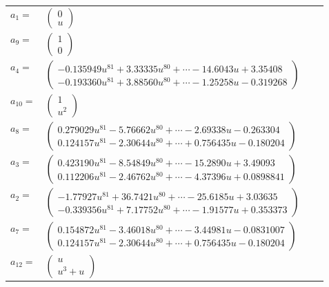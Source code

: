 \documentclass[1p]{elsarticle_modified}
\theoremstyle{definition}
\begin{document}
\begin{tabular}{m{7pt} m{180pt} m{7pt} m{180pt} }
\flushright $a_{1}=$&$\begin{pmatrix}0\\u\end{pmatrix}$ \\
\flushright $a_{9}=$&$\begin{pmatrix}1\\0\end{pmatrix}$ \\
\flushright $a_{4}=$&$\begin{pmatrix}-0.135949 u^{81}+3.33335 u^{80}+\cdots-14.6043 u+3.35408\\-0.193360 u^{81}+3.88560 u^{80}+\cdots-1.25258 u-0.319268\end{pmatrix}$ \\
\flushright $a_{10}=$&$\begin{pmatrix}1\\u^2\end{pmatrix}$ \\
\flushright $a_{8}=$&$\begin{pmatrix}0.279029 u^{81}-5.76662 u^{80}+\cdots-2.69338 u-0.263304\\0.124157 u^{81}-2.30644 u^{80}+\cdots+0.756435 u-0.180204\end{pmatrix}$ \\
\flushright $a_{3}=$&$\begin{pmatrix}0.423190 u^{81}-8.54849 u^{80}+\cdots-15.2890 u+3.49093\\0.112206 u^{81}-2.46762 u^{80}+\cdots-4.37396 u+0.0898841\end{pmatrix}$ \\
\flushright $a_{2}=$&$\begin{pmatrix}-1.77927 u^{81}+36.7421 u^{80}+\cdots-25.6185 u+3.03635\\-0.339356 u^{81}+7.17752 u^{80}+\cdots-1.91577 u+0.353373\end{pmatrix}$ \\
\flushright $a_{7}=$&$\begin{pmatrix}0.154872 u^{81}-3.46018 u^{80}+\cdots-3.44981 u-0.0831007\\0.124157 u^{81}-2.30644 u^{80}+\cdots+0.756435 u-0.180204\end{pmatrix}$ \\
\flushright $a_{12}=$&$\begin{pmatrix}u\\u^3+u\end{pmatrix}$ \\

\end{tabular}
\end{document}
